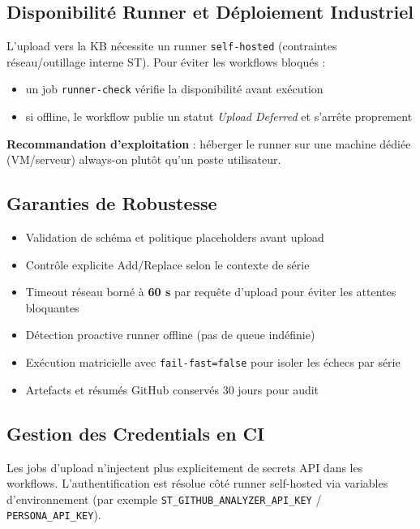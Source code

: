 \documentclass[12pt,a4paper]{report}
\begin{document}
\subsection{Disponibilité Runner et Déploiement Industriel}

L'upload vers la KB nécessite un runner \texttt{self-hosted} (contraintes réseau/outillage interne ST). Pour éviter les workflows bloqués :
\begin{itemize}
  \item un job \texttt{runner-check} vérifie la disponibilité avant exécution
  \item si offline, le workflow publie un statut \textit{Upload Deferred} et s'arrête proprement
\end{itemize}

\textbf{Recommandation d'exploitation} : héberger le runner sur une machine dédiée (VM/serveur) always-on plutôt qu'un poste utilisateur.

\subsection{Garanties de Robustesse}

\begin{itemize}
  \item Validation de schéma et politique placeholders avant upload
  \item Contrôle explicite Add/Replace selon le contexte de série
  \item Timeout réseau borné à \textbf{60 s} par requête d'upload pour éviter les attentes bloquantes
  \item Détection proactive runner offline (pas de queue indéfinie)
  \item Exécution matricielle avec \texttt{fail-fast=false} pour isoler les échecs par série
  \item Artefacts et résumés GitHub conservés 30 jours pour audit
\end{itemize}

\subsection{Gestion des Credentials en CI}

Les jobs d'upload n'injectent plus explicitement de secrets API dans les workflows.
L'authentification est résolue côté runner self-hosted via variables d'environnement
(par exemple \texttt{ST\_GITHUB\_ANALYZER\_API\_KEY} / \texttt{PERSONA\_API\_KEY}).
\end{document}

